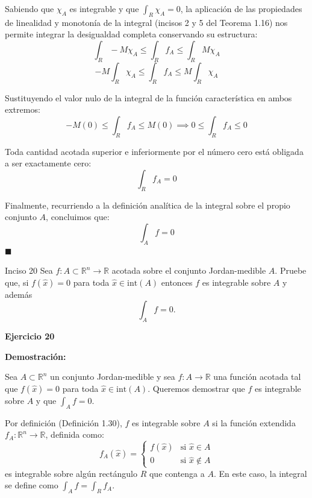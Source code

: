 \documentclass[11pt,letterpaper]{article}
\begin{document}
Sabiendo que $\chi_A$ es integrable y que $\int_R \chi_A = 0$, la aplicación de las propiedades de linealidad y monotonía de la integral (incisos 2 y 5 del Teorema 1.16) nos permite integrar la desigualdad completa conservando su estructura:
\begin{equation*}
\int_R -M \chi_A \le \int_R f_A \le \int_R M \chi_A
\end{equation*}
\begin{equation*}
-M \int_R \chi_A \le \int_R f_A \le M \int_R \chi_A
\end{equation*}

Sustituyendo el valor nulo de la integral de la función característica en ambos extremos:
\begin{equation*}
-M (0) \le \int_R f_A \le M (0) \implies 0 \le \int_R f_A \le 0
\end{equation*}

Toda cantidad acotada superior e inferiormente por el número cero está obligada a ser exactamente cero:
\begin{equation*}
\int_R f_A = 0
\end{equation*}

Finalmente, recurriendo a la definición analítica de la integral sobre el propio conjunto $A$, concluimos que:
\begin{equation*}
\int_A f = 0
\end{equation*}
\hfill $\blacksquare$

\begin{inciso}{Inciso 20}
Sea $f:A\subset\mathbb{R}^{n}\rightarrow\mathbb{R}$ acotada sobre el conjunto Jordan-medible $A$. Pruebe que, si $f(\hat{x})=0$ para toda $\hat{x}\in \text{int}(A)$ entonces $f$ es integrable sobre $A$ y además
\begin{equation*}
    \int_{A}f=0.
\end{equation*}
\end{inciso}

\textbf{Ejercicio 20}

\textbf{Demostración:}

Sea $A \subset \mathbb{R}^n$ un conjunto Jordan-medible y sea $f: A \rightarrow \mathbb{R}$ una función acotada tal que $f(\hat{x}) = 0$ para toda $\hat{x} \in \text{int}(A)$. Queremos demostrar que $f$ es integrable sobre $A$ y que $\int_A f = 0$.

Por definición (Definición 1.30), $f$ es integrable sobre $A$ si la función extendida $f_A: \mathbb{R}^n \rightarrow \mathbb{R}$, definida como:
\begin{equation*}
f_A(\hat{x}) = 
\begin{cases} 
f(\hat{x}) & \text{si } \hat{x} \in A \\ 
0 & \text{si } \hat{x} \notin A 
\end{cases}
\end{equation*}
es integrable sobre algún rectángulo $R$ que contenga a $A$. En este caso, la integral se define como $\int_A f = \int_R f_A$.
\end{document}
